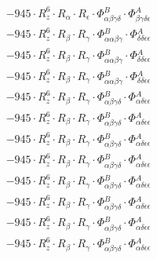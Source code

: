 \documentclass{article}
\begin{document}
\begin{subequations}
\begin{gather}
\begin{array}{c}
 \\[0.2em] 		 - 945 \cdot R_{z}^{6} \cdot R_{\alpha{}} \cdot R_{\epsilon{}} \cdot \Phi{}^{B}_{\alpha{}\beta{}\gamma{}\delta{}} \cdot \Phi{}^{A}_{\beta{}\gamma{}\delta{}\epsilon{}} 
 \\[0.2em] 		 - 945 \cdot R_{z}^{6} \cdot R_{\beta{}} \cdot R_{\gamma{}} \cdot \Phi{}^{B}_{\alpha{}\alpha{}\beta{}\gamma{}} \cdot \Phi{}^{A}_{\delta{}\delta{}\epsilon{}\epsilon{}} 
 \\[0.2em] 		 - 945 \cdot R_{z}^{6} \cdot R_{\beta{}} \cdot R_{\gamma{}} \cdot \Phi{}^{B}_{\alpha{}\alpha{}\beta{}\gamma{}} \cdot \Phi{}^{A}_{\delta{}\delta{}\epsilon{}\epsilon{}} 
 \\[0.2em] 		 - 945 \cdot R_{z}^{6} \cdot R_{\beta{}} \cdot R_{\gamma{}} \cdot \Phi{}^{B}_{\alpha{}\alpha{}\beta{}\gamma{}} \cdot \Phi{}^{A}_{\delta{}\delta{}\epsilon{}\epsilon{}} 
 \\[0.2em] 		 - 945 \cdot R_{z}^{6} \cdot R_{\beta{}} \cdot R_{\gamma{}} \cdot \Phi{}^{B}_{\alpha{}\beta{}\gamma{}\delta{}} \cdot \Phi{}^{A}_{\alpha{}\delta{}\epsilon{}\epsilon{}} 
 \\[0.2em] 		 - 945 \cdot R_{z}^{6} \cdot R_{\beta{}} \cdot R_{\gamma{}} \cdot \Phi{}^{B}_{\alpha{}\beta{}\gamma{}\delta{}} \cdot \Phi{}^{A}_{\alpha{}\delta{}\epsilon{}\epsilon{}} 
 \\[0.2em] 		 - 945 \cdot R_{z}^{6} \cdot R_{\beta{}} \cdot R_{\gamma{}} \cdot \Phi{}^{B}_{\alpha{}\beta{}\gamma{}\delta{}} \cdot \Phi{}^{A}_{\alpha{}\delta{}\epsilon{}\epsilon{}} 
 \\[0.2em] 		 - 945 \cdot R_{z}^{6} \cdot R_{\beta{}} \cdot R_{\gamma{}} \cdot \Phi{}^{B}_{\alpha{}\beta{}\gamma{}\delta{}} \cdot \Phi{}^{A}_{\alpha{}\delta{}\epsilon{}\epsilon{}} 
 \\[0.2em] 		 - 945 \cdot R_{z}^{6} \cdot R_{\beta{}} \cdot R_{\gamma{}} \cdot \Phi{}^{B}_{\alpha{}\beta{}\gamma{}\delta{}} \cdot \Phi{}^{A}_{\alpha{}\delta{}\epsilon{}\epsilon{}} 
 \\[0.2em] 		 - 945 \cdot R_{z}^{6} \cdot R_{\beta{}} \cdot R_{\gamma{}} \cdot \Phi{}^{B}_{\alpha{}\beta{}\gamma{}\delta{}} \cdot \Phi{}^{A}_{\alpha{}\delta{}\epsilon{}\epsilon{}} 
 \\[0.2em] 		 - 945 \cdot R_{z}^{6} \cdot R_{\beta{}} \cdot R_{\gamma{}} \cdot \Phi{}^{B}_{\alpha{}\beta{}\gamma{}\delta{}} \cdot \Phi{}^{A}_{\alpha{}\delta{}\epsilon{}\epsilon{}} 
 \\[0.2em] 		 - 945 \cdot R_{z}^{6} \cdot R_{\beta{}} \cdot R_{\gamma{}} \cdot \Phi{}^{B}_{\alpha{}\beta{}\gamma{}\delta{}} \cdot \Phi{}^{A}_{\alpha{}\delta{}\epsilon{}\epsilon{}} 

\end{array}
\end{gather}
\end{subequations}
\end{document}
